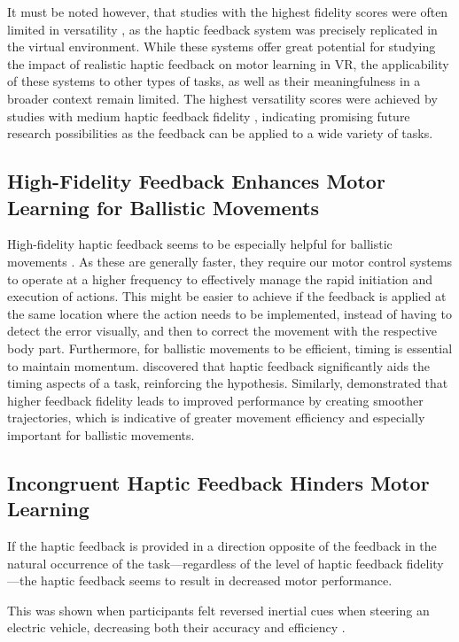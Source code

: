 It must be noted however, that studies with the highest fidelity scores were often limited in versatility \cite{Huang2007, LeeH2014, Vaghela2021}, as the haptic feedback system was precisely replicated in the virtual environment. While these systems offer great potential for studying the impact of realistic haptic feedback on motor learning in VR, the applicability of these systems to other types of tasks, as well as their meaningfulness in a broader context remain limited.
The highest versatility scores were achieved by studies with medium haptic feedback fidelity \cite{Yang2023, McAnally2023}, indicating promising future research possibilities as the feedback can be applied to a wide variety of tasks.

\subsection{High-Fidelity Feedback Enhances Motor Learning for Ballistic Movements}

High-fidelity haptic feedback seems to be especially helpful for ballistic movements \cite{Wall2000}. As these are generally faster, they require our motor control systems to operate at a higher frequency to effectively manage the rapid initiation and execution of actions. This might be easier to achieve if the feedback is applied at the same location where the action needs to be implemented, instead of having to detect the error visually, and then to correct the movement with the respective body part. Furthermore, for ballistic movements to be efficient, timing is essential to maintain momentum. \cite{Feygin2002HapticSkill} discovered that haptic feedback significantly aids the timing aspects of a task, reinforcing the hypothesis. Similarly, \cite{Chi2017} demonstrated that higher feedback fidelity leads to improved performance by creating smoother trajectories, which is indicative of greater movement efficiency and especially important for ballistic movements.


\subsection{Incongruent Haptic Feedback Hinders Motor Learning}
If the haptic feedback is provided in a direction opposite of the feedback in the natural occurrence of the task---regardless of the level of haptic feedback fidelity---the haptic feedback seems to result in decreased motor performance. 

This was shown when participants felt reversed inertial cues when steering an electric vehicle, decreasing both their accuracy and efficiency \cite{Macuga2019}. 


